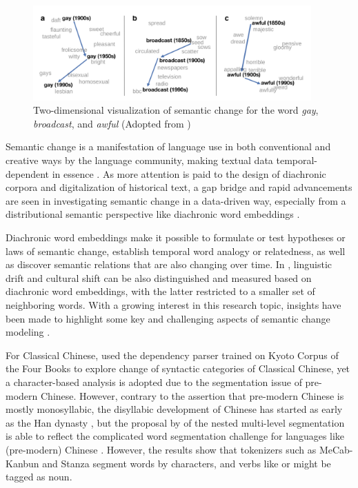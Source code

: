 \vspace*{\baselineskip}
\begin{figure}[H]
  \centering
  \includegraphics[width=0.95\textwidth,keepaspectratio]{figures_ref/Hamilton_et_al_2016_two_dimension_viz_of_semantic_change.png}
  \caption{Two-dimensional visualization of semantic change for the word \textit{gay}, \textit{broadcast}, and \textit{awful} (Adopted from \textcite{hamilton2016law})} \label{fig:hamilton}
\end{figure}

Semantic change is a manifestation of language use in both conventional and creative ways by the language community, making textual data temporal-dependent in essence \parencite{kutuzov2018survey}. As more attention is paid to the design of diachronic corpora and digitalization of historical text, a gap bridge and rapid advancements are seen in investigating semantic change in a data-driven way, especially from a distributional semantic perspective like diachronic word embeddings \parencite{kutuzov2018survey, tahmasebi2018survey, hamilton2016law, jawahar2019contextualized}.

Diachronic word embeddings make it possible to formulate or test hypotheses or laws of semantic change, establish temporal word analogy or relatedness, as well as discover semantic relations that are also changing over time. In \textcite{hamilton2016cultural}, linguistic drift and cultural shift can be also distinguished and measured based on diachronic word embeddings, with the latter restricted to a smaller set of neighboring words. With a growing interest in this research topic, insights have been made to highlight some key and challenging aspects of semantic change modeling \parencite{kutuzov2018survey,tahmasebi2018survey,camacho2018survey}.

For Classical Chinese, \textcite{li2020evolution} used the dependency parser trained on Kyoto Corpus of the Four Books to explore change of syntactic categories of Classical Chinese, yet a character-based analysis is adopted due to the segmentation issue of pre-modern Chinese. However, contrary to the assertion that pre-modern Chinese is mostly monosyllabic, the disyllabic development of Chinese has started as early as the Han dynasty \parencite{zhou2009,chang2008}, but the proposal by \textcite{lee2012classical} of the nested multi-level segmentation is able to reflect the complicated word segmentation challenge for languages like (pre-modern) Chinese . However, the results show that tokenizers such as MeCab-Kanbun and Stanza segment words by characters, and verbs like  or  might be tagged as noun.

